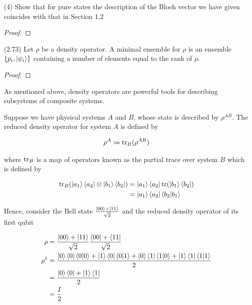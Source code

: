 \documentclass[main.tex]{subfiles}
\begin{document}
\begin{subappendices}
\begin{exercise}
(4) Show that for pure states the description of the Bloch vector we have given coincides with that in Section 1.2

\begin{proof}
	
\end{proof}

\end{exercise}

\begin{exercise}
(2.73)
Let $\rho$ be a density operator. A minimal ensemble for $\rho$ is an ensemble $\{ p_i, \ket{\psi_i}\}$ containing a number of elements equal to the rank of $\rho$. 

\begin{proof}
\end{proof}	
\end{exercise}

As mentioned above, density operators are powerful tools for describing subsystems of composite systems. 
 
Suppose we have physical systems $A$ and $B$, whose state is described by $\rho^{AB}$. The reduced density operator for system $A$ is defined by

\begin{align*}
\rho^A \coloneqq \tr_B(\rho^{AB})
\end{align*}

where $\tr_B$ is a map of operators known as the partial trace over system $B$ which is defined by

\begin{align*}
\tr_B(\ket{a_1}\bra{a_2} \otimes \ket{b_1}\bra{b_2}) &= \ket{a_1}\bra{a_2} \tr( \ket{b_1}\bra{b_2}) \\
&= \ket{a_1}\bra{a_2} \bra{b_2}\ket{b_1}
\end{align*}

Hence, consider the Bell state $\frac{\ket{00} + \ket{11}}{\sqrt{2}}$ and the reduced density operator of its first qubit

\begin{align*}
\rho &= \frac{\ket{00} + \ket{11}}{\sqrt{2}}\frac{\bra{00} + \bra{11}}{\sqrt{2}} \\
\rho^1 &= \frac{\ket{0}\bra{0}\bra{0}\ket{0}+\ket{1}\bra{0}\bra{0}\ket{1}+ \ket{0}\bra{1}\bra{1}\ket{0}+ \ket{1}\bra{1}\bra{1}\ket{1}}{2} \\
&= \frac{\ket{0}\bra{0} + \ket{1}\bra{1}}{2} \\
&= \frac{I}{2}
\end{align*}


\end{subappendices}
\end{document}
